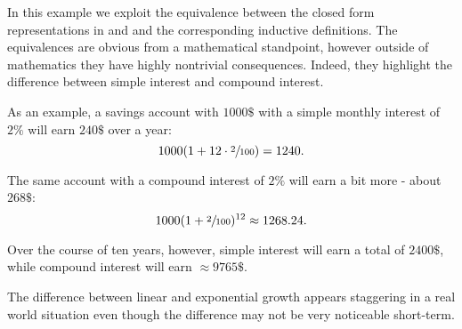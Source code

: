 \begin{remark}\label{rem:progressions_and_interest}
  In this example we exploit the equivalence between the closed form representations in  and  and the corresponding inductive definitions. The equivalences are obvious from a mathematical standpoint, however outside of mathematics they have highly nontrivial consequences. Indeed, they highlight the difference between simple interest and compound interest.

  As an example, a savings account with \( 1000\$ \) with a simple monthly interest of \( 2\% \) will earn \( 240\$ \) over a year:
  \begin{equation*}
    1000 (1 + 12 \cdot \sfrac 2 {100}) = 1240.
  \end{equation*}

  The same account with a compound interest of \( 2\% \) will earn a bit more - about \( 268\$ \):
  \begin{equation*}
    1000 (1 + \sfrac 2 {100})^{12} \approx 1268.24.
  \end{equation*}

  Over the course of ten years, however, simple interest will earn a total of \( 2400\$ \), while compound interest will earn \( \approx 9765\$ \).

  The difference between linear and exponential growth appears staggering in a real world situation even though the difference may not be very noticeable short-term.
\end{remark}

